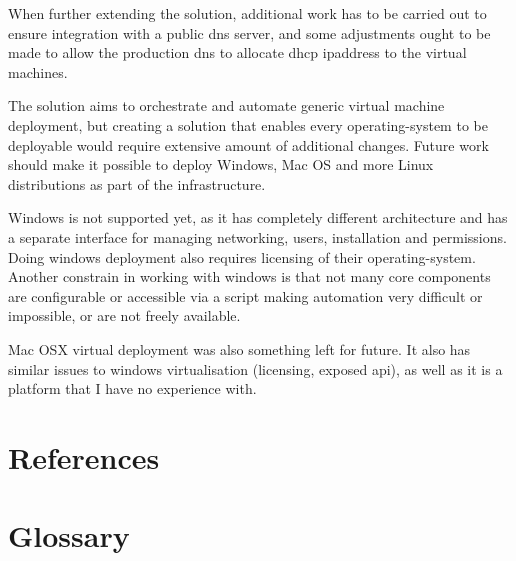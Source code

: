 \documentclass{article}
\begin{document}
When further extending the solution, additional work has to be carried out to ensure integration with a public \gls{dns} server, and some adjustments ought to be made to allow the production \gls{dns} to allocate \gls{dhcp} \gls{ipaddress} to the virtual machines.

The solution aims to orchestrate and automate generic virtual machine deployment, but creating a solution that enables every \gls{operating-system} to be deployable would require extensive amount of additional changes. Future work should make it possible to deploy Windows, Mac OS and more Linux distributions as part of the infrastructure.

Windows is not supported yet, as it has completely different architecture and has a separate interface for managing networking, users, installation and permissions. Doing windows deployment also requires licensing of their \gls{operating-system}. Another constrain in working with windows is that not many core components are configurable or accessible via a script making automation very difficult or impossible, or are not freely available.

Mac OSX virtual deployment was also something left for future. It also has similar issues to windows virtualisation (licensing, exposed \gls{api}), as well as it is a platform that I have no experience with.

\newpage
\section{References}


\renewcommand{\bibname}{}

\newpage
\section{Glossary}
\printglossary
\newpage
\end{document}
